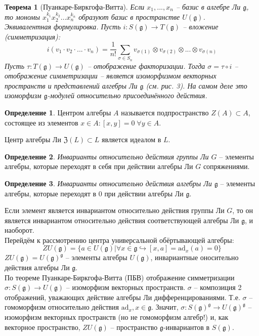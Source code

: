 \documentclass[12pt]{article}
\newtheorem{theorem}{Теорема}[]
\theoremstyle{definition}
\newtheorem{defin}{Определение}[]
\begin{document}
\begin{theorem}[Пуанкаре-Биркгофа-Витта]
Если $x_1,...,x_n$ -- базис в алгебре Ли $\mathfrak{g}$, то мономы $x_1^{k_1}x_2^{k_2}...x_n^{k_n}$ образуют базис в пространстве $U(\mathfrak{g})$.\\
Эквивалентная формулировка. Пусть $i:S(\mathfrak{g})\rightarrow T(\mathfrak{g})$ -- вложение (симметризация):
\begin{equation}
    i(v_1\cdot v_2\cdot...\cdot v_n)=\frac{1}{n!}\sum\limits_{\sigma\in S_n}v_{\sigma(1)}\otimes v_{\sigma(2)}\otimes...\otimes v_{\sigma(n)}
\end{equation}
Пусть $\tau:T(\mathfrak{g})\rightarrow U(\mathfrak{g})$ -- отображение факторизации. Тогда $\sigma=\tau\circ i$ -- отображение симметризации -- является изоморфизмом векторных пространств и представлений алгебры Ли $\mathfrak{g}$ (см. рис. 3). На самом деле это изоморфизм $\mathfrak{g}$-модулей относительно присоединённого действия.
\end{theorem}
\begin{defin}
    Центром алгебры $A$ называется подпространство $Z(A)\subset A$, состоящее из элементов $x \in A:[x,y]=0\;\forall y\in A$.
\end{defin}
 Центр алгебры Ли $\mathfrak{Z}(L)\subset L$ является идеалом в $L$.
\begin{defin}
    \textit{Инварианты относительно действия группы Ли $G$} -- элементы алгебры, которые переходят в себя при действии алгебры Ли $G$ сопряжениями.
\end{defin}
\begin{defin}
    \textit{Инварианты относительно действия алгебры Ли $\mathfrak{g}$} -- элементы алгебры, которые переходят в 0 при действии алгебры Ли $\mathfrak{g}$.
\end{defin}
Если элемент является инвариантом относительно действия группы Ли $G$, то он является инвариантом относительно действия соответствующей алгебры Ли $\mathfrak{g}$, и наоборот.\\
Перейдём к рассмотрению центра универсальной обёртывающей алгебры:
\begin{equation}
    ZU(\mathfrak{g})=\{a\in U(\mathfrak{g})|\forall x\in\mathfrak{g}\hookrightarrow[x,a]=\text{ad}_x(a)=0\}
\end{equation}
$ZU(\mathfrak{g})=U(\mathfrak{g})^{\mathfrak{g}}$ -- элементы алгебры $U(\mathfrak{g})$, инвариантные оносительно действия алгебры Ли $\mathfrak{g}$.\\
По теореме Пуанкаре-Биркгофа-Витта (ПБВ) отображение симметризации $\sigma:S(\mathfrak{g})\rightarrow U(\mathfrak{g})$ -- изоморфизм векторных пространств. $\sigma$ -- композиция 2 отображений, уважающих действие алгебры Ли дифференцированиями. Т.е. $\sigma$ -- гомоморфизм относительно действия $\text{ad}_x,x\in\mathfrak{g}$. Значит, $\sigma:S(\mathfrak{g})^\mathfrak{g}\rightarrow U(\mathfrak{g})^\mathfrak{g}$ -- изоморфизм векторных пространств (но не гомоморфизм алгебр!) и, как векторное пространство, $ZU(\mathfrak{g})$ -- пространство $\mathfrak{g}$-инвариантов в $S(\mathfrak{g})$.\\
\end{document}
